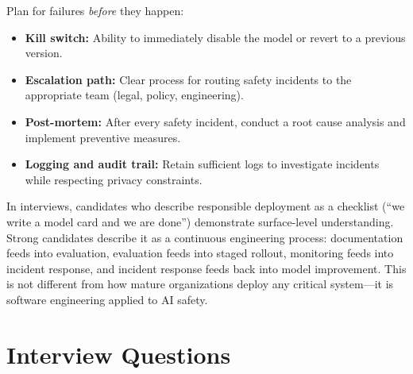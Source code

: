 Plan for failures \emph{before} they happen:

\begin{itemize}
    \item \textbf{Kill switch:} Ability to immediately disable the model or
    revert to a previous version.
    \item \textbf{Escalation path:} Clear process for routing safety incidents
    to the appropriate team (legal, policy, engineering).
    \item \textbf{Post-mortem:} After every safety incident, conduct a root
    cause analysis and implement preventive measures.
    \item \textbf{Logging and audit trail:} Retain sufficient logs to
    investigate incidents while respecting privacy constraints.
\end{itemize}

\begin{keyinsight}
In interviews, candidates who describe responsible deployment as a checklist
(``we write a model card and we are done'') demonstrate surface-level
understanding.  Strong candidates describe it as a continuous engineering
process: documentation feeds into evaluation, evaluation feeds into staged
rollout, monitoring feeds into incident response, and incident response feeds
back into model improvement.  This is not different from how mature
organizations deploy any critical system---it is software engineering
applied to AI safety.
\end{keyinsight}

\section{Interview Questions}
\label{sec:safety_interview_questions}

